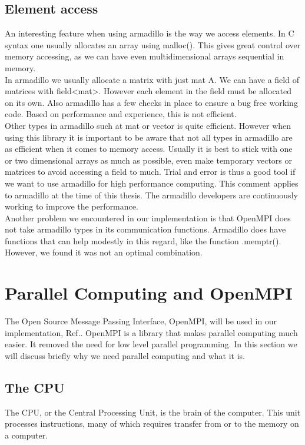\subsection{Element access}
An interesting feature when using armadillo is the way we access elements. In C syntax one usually allocates an array using malloc(). This gives great control over memory accessing, as we can have even multidimensional arrays sequential in memory. \\

In armadillo we usually allocate a matrix with just mat A. We can have a field of matrices with field<mat>. However each element in the field must be allocated on its own. Also armadillo has a few checks in place to ensure a bug free working code. Based on performance and experience, this is not efficient. \\

Other types in armadillo such at mat or vector is quite efficient. However when using this library it is important to be aware that not all types in armadillo are as efficient when it comes to memory access. Usually it is best to stick with one or two dimensional arrays as much as possible, even make temporary vectors or matrices to avoid accessing a field to much. Trial and error is thus a good tool if we want to use armadillo for high performance computing. This comment applies to armadillo at the time of this thesis. The armadillo developers are continuously working to improve the performance. \\

Another problem we encountered in our implementation is that OpenMPI does not take armadillo types in its communication functions. Armadillo does have functions that can help modestly in this regard, like the function .memptr(). However, we found it was not an optimal combination.

\section{Parallel Computing and OpenMPI}
The Open Source Message Passing Interface, OpenMPI, will be used in our implementation, Ref.\cite{openmpi_cite}. OpenMPI is a library that makes parallel computing much easier. It removed the need for low level parallel programming. In this section we will discuss briefly why we need parallel computing and what it is.

\subsection{The CPU \label{the_cpu_section}}
The CPU, or the Central Processing Unit, is the brain of the computer. This unit processes instructions, many of which requires transfer from or to the memory on a computer. \\

